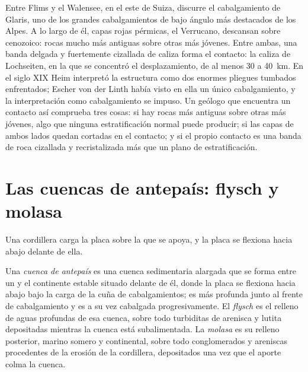 \begin{inthefield}
Entre Flims y el Walensee, en el este de Suiza, discurre el cabalgamiento de Glaris, uno de los
grandes cabalgamientos de bajo ángulo más destacados de los Alpes. A lo largo de él, capas rojas pérmicas, el
Verrucano, descansan sobre  cenozoico: rocas mucho más antiguas sobre otras más jóvenes. Entre ambas, una
banda delgada y fuertemente cizallada de caliza forma el contacto: la caliza de Lochseiten, en la que se concentró el desplazamiento, de al menos 30 a
\qty{40}{km}. En el siglo XIX Heim interpretó la estructura como dos enormes
pliegues tumbados enfrentados; Escher von der Linth había visto en ella un único cabalgamiento, y la interpretación como cabalgamiento se impuso. Un geólogo que encuentra un contacto así comprueba
tres cosas: si hay rocas más antiguas sobre otras más jóvenes, algo que ninguna estratificación normal puede producir;
si las capas de ambos lados quedan cortadas en el contacto; y si el propio contacto
es una banda de roca cizallada y recristalizada más que un plano de estratificación.
\end{inthefield}

\section{Las cuencas de antepaís: flysch y molasa}\label{sec:b2:alpine-orogen:foreland}

Una cordillera carga la placa sobre la que se apoya, y la placa se flexiona hacia abajo delante de ella.

\begin{definition}\label{def:b2:alpine-orogen:foreland}
Una \emph{cuenca de antepaís} es una cuenca sedimentaria alargada que se forma
entre un  y el continente estable situado delante de él, donde la placa se flexiona hacia abajo bajo
la carga de la cuña de cabalgamientos; es más profunda junto al frente de cabalgamiento y es a su vez
cabalgada progresivamente. El \emph{flysch} es el relleno de aguas profundas de esa
cuenca, sobre todo turbiditas de arenisca y lutita depositadas mientras la cuenca está subalimentada.
La \emph{molasa} es su relleno posterior, marino somero y continental, sobre todo
conglomerados y areniscas procedentes de la erosión de la cordillera, depositados una vez que el aporte colma la
cuenca.
\end{definition}


